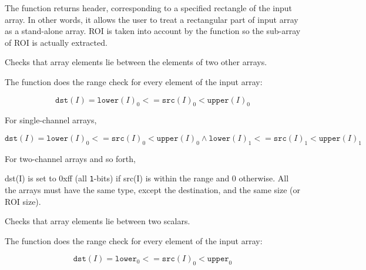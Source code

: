 The function returns header, corresponding to
a specified rectangle of the input array. In other words, it allows
the user to treat a rectangular part of input array as a stand-alone
array. ROI is taken into account by the function so the sub-array of
ROI is actually extracted.

Checks that array elements lie between the elements of two other arrays.


\begin{description}
\end{description}


The function does the range check for every element of the input array:

\[
\texttt{dst}(I)=\texttt{lower}(I)_0 <= \texttt{src}(I)_0 < \texttt{upper}(I)_0
\]

For single-channel arrays,

\[
\texttt{dst}(I)=
\texttt{lower}(I)_0 <= \texttt{src}(I)_0 < \texttt{upper}(I)_0 \land
\texttt{lower}(I)_1 <= \texttt{src}(I)_1 < \texttt{upper}(I)_1
\]

For two-channel arrays and so forth,

dst(I) is set to 0xff (all \texttt{1}-bits) if src(I) is within the range and 0 otherwise. All the arrays must have the same type, except the destination, and the same size (or ROI size).


Checks that array elements lie between two scalars.


\begin{description}
\end{description}


The function does the range check for every element of the input array:

\[
\texttt{dst}(I)=\texttt{lower}_0 <= \texttt{src}(I)_0 < \texttt{upper}_0
\]

